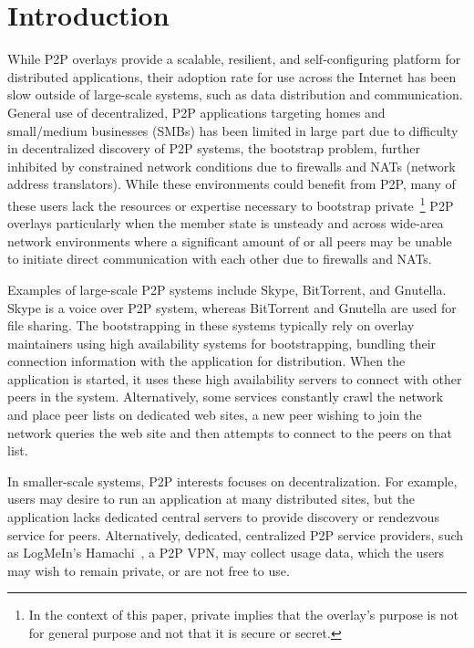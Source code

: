 \documentclass[conference]{IEEEtran}
\begin{document}
\section{Introduction}

While P2P overlays provide a scalable, resilient, and self-configuring platform
for distributed applications, their adoption rate for use across the Internet
has been slow outside of large-scale systems, such as data distribution and
communication.  General use of decentralized, P2P applications targeting homes
and small/medium businesses (SMBs) has been limited in large part due to
difficulty in decentralized discovery of P2P systems, the bootstrap problem,
further inhibited by constrained network conditions due to firewalls and NATs
(network address translators).  While these environments could benefit from
P2P, many of these users lack the resources or expertise necessary to bootstrap
private~\footnote{In the context of this paper, private implies that the
overlay's purpose is not for general purpose and not that it is secure or
secret.}  P2P overlays particularly when the member state is unsteady and
across wide-area network environments where a significant amount of or all
peers may be unable to initiate direct communication with each other due to
firewalls and NATs.

Examples of large-scale P2P systems include Skype, BitTorrent, and Gnutella.
Skype is a voice over P2P system, whereas BitTorrent and Gnutella are used for
file sharing.  The bootstrapping in these systems typically rely on overlay
maintainers using high availability systems for bootstrapping, bundling their
connection information with the application for distribution.  When the
application is started, it uses these high availability servers to connect with
other peers in the system.  Alternatively, some services constantly crawl the
network and place peer lists on dedicated web sites, a new peer wishing to join
the network queries the web site and then attempts to connect to the peers on
that list.

In smaller-scale systems, P2P interests focuses on decentralization.  For
example, users may desire to run an application at many distributed sites, but
the application lacks dedicated central servers to provide discovery or
rendezvous service for peers.  Alternatively, dedicated, centralized P2P
service providers, such as LogMeIn's Hamachi~\cite{hamachi}, a P2P VPN, may
collect usage data, which the users may wish to remain private, or are not free
to use.
\end{document}
